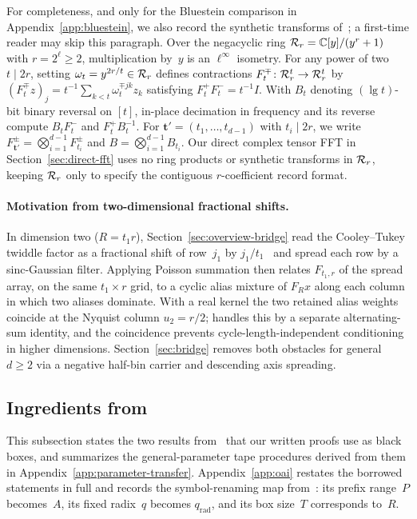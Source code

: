 For completeness, and only for the Bluestein comparison in Appendix~\ref{app:bluestein}, we also record the synthetic transforms of~\cite[\S6]{OAI26}; a first-time reader may skip this paragraph. Over the negacyclic ring $\mathcal{R}_r=\mathbb{C}[y]/(y^r+1)$ with $r=2^\ell\ge 2$, multiplication by~$y$ is an $\ell^\infty$ isometry. For any power of two $t\mid 2r$, setting $\omega_t=y^{2r/t}\in\mathcal{R}_r$ defines contractions $F_t^\mp\colon\mathcal{R}_r^t\to\mathcal{R}_r^t$ by $(F_t^\mp z)_j=t^{-1}\sum_{k<t}\omega_t^{\mp jk}z_k$ satisfying $F_t^+ F_t^-=t^{-1}I$. With $B_t$ denoting $(\lg t)$-bit binary reversal on $[t]$, in-place decimation in frequency and its reverse compute $B_t F_t^-$ and $F_t^+ B_t^{-1}$. For $\mathbf t'=(t_1,\dots,t_{d-1})$ with $t_i\mid 2r$, we write $F_{\mathbf t'}^\pm=\bigotimes_{i=1}^{d-1}F_{t_i}^\pm$ and $B=\bigotimes_{i=1}^{d-1}B_{t_i}$. Our direct complex tensor FFT in Section~\ref{sec:direct-fft} uses no ring products or synthetic transforms in $\mathcal{R}_r$, keeping $\mathcal{R}_r$ only to specify the contiguous $r$-coefficient record format.

\paragraph{Motivation from two-dimensional fractional shifts.}
In dimension two ($R=t_1 r$), Section~\ref{sec:overview-bridge} read the Cooley--Tukey twiddle factor as a fractional shift of row~$j_1$ by $j_1/t_1$~\cite{MS} and spread each row by a sinc-Gaussian filter. Applying Poisson summation then relates $F_{t_1,r}$ of the spread array, on the same $t_1\times r$ grid, to a cyclic alias mixture of $F_R x$ along each column in which two aliases dominate. With a real kernel the two retained alias weights coincide at the Nyquist column $u_2=r/2$; \cite{MS} handles this by a separate alternating-sum identity, and the coincidence prevents cycle-length-independent conditioning in higher dimensions. Section~\ref{sec:bridge} removes both obstacles for general $d\ge 2$ via a negative half-bin carrier and descending axis spreading.

\subsection{Ingredients from \texorpdfstring{\cite{OAI26}}{[OAI26]}}\label{sec:prelim-oai}

This subsection states the two results from~\cite{OAI26} that our written proofs use as black boxes, and summarizes the general-parameter tape procedures derived from them in Appendix~\ref{app:parameter-transfer}. Appendix~\ref{app:oai} restates the borrowed statements in full and records the symbol-renaming map from~\cite{OAI26}: its prefix range~$P$ becomes~$A$, its fixed radix~$q$ becomes $q_{\mathrm{rad}}$, and its box size~$T$ corresponds to~$R$.

